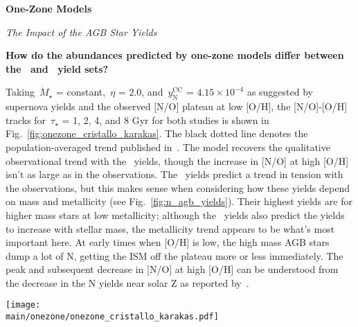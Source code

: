 \documentclass[\main/notes.tex]{subfiles}
\begin{document}
 
\begin{center} 
\textbf{{\Large One-Zone Models}} 
\end{center} 

\noindent 
{\Large \textit{The Impact of the AGB Star Yields}} 
\par\noindent 
\textbf{How do the abundances predicted by one-zone models differ between 
the~\citet{Cristallo2011} and~\citet{Karakas2010} yield sets?} 
\par\noindent 
Taking~$\dot{M}_\star$ = constant,~$\eta$ = 2.0, and~$y_\text{N}^\text{CC}$ = 
$4.15\times10^{-4}$ as suggested by supernova yields and the observed 
[N/O] plateau at low [O/H], the [N/O]-[O/H] tracks for~$\tau_\star$ = 1, 2, 4, 
and 8 Gyr for both studies is shown in Fig.~\ref{fig:onezone_cristallo_karakas}. 
The black dotted line denotes the population-averaged trend published 
in~\citet*{Henry2000}. 
The model recovers the qualitative observational trend with 
the~\citet{Cristallo2011} yields, though the increase in [N/O] at high [O/H] 
isn't as large as in the observations. 
The~\citet{Karakas2010} yields predict a trend in tension with the observations, 
but this makes sense when considering how these yields depend on mass and 
metallicity (see Fig.~\ref{fig:n_agb_yields}). 
Their highest yields are for higher mass stars at low metallicity; although 
the~\citet{Cristallo2011} yields also predict the yields to increase with 
stellar mass, the metallicity trend appears to be what's most important here. 
At early times when [O/H] is low, the high mass AGB stars dump a lot of N, 
getting the ISM off the plateau more or less immediately. 
The peak and subsequent decrease in [N/O] at high [O/H] can be understood from 
the decrease in the N yields near solar Z as reported by~\citet{Karakas2010}. 

\begin{figure*} 
\texttt{[image: \\main/onezone/onezone\_cristallo\_karakas.pdf]} 
\caption{[N/O]-[O/H] tracks as predicted by~\citet{Cristallo2011} (left) 
and~\citet{Karakas2010} (right). } 
\label{fig:onezone_cristallo_karakas} 
\end{figure*} 
\end{document}
